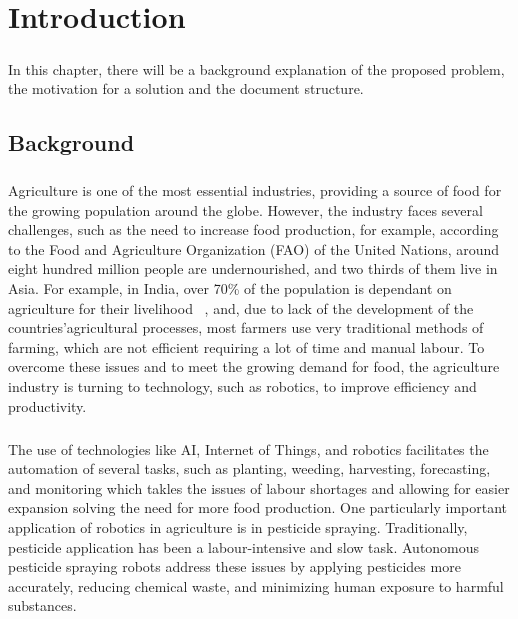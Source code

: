 
%

\chapter{Introduction}
\label{cha:introduction}
\paragraph{}In this chapter, there will be a background explanation of the proposed problem, 
the motivation for a solution and the document structure.

\section{Background}
\label{sec:background} 
\paragraph{}Agriculture is one of the most essential industries, providing a source of food for the growing population 
around the globe. However, the industry faces several challenges, such as the need to increase food production, 
for example, according to the Food and Agriculture Organization (FAO) of the United Nations, around eight hundred million 
people are undernourished, and two thirds of them live in Asia. For example, in India, over 70\% of the population 
is dependant on agriculture for their livelihood ~\cite{agriIndia}, and, due to lack of the development of 
the countries’agricultural processes, most farmers use very traditional methods of farming, which are not efficient 
requiring a lot of time and manual labour. To overcome these issues and to meet the growing demand for food,
the agriculture industry is turning to technology, such as robotics, to improve efficiency and productivity.
\paragraph{}The use of technologies like AI, Internet of Things, and robotics facilitates the automation of 
several tasks, such as planting, weeding, harvesting, forecasting, and monitoring which takles the issues of 
labour shortages and allowing for easier expansion solving the need for more food production. One particularly important application of robotics in agriculture is in pesticide spraying. 
Traditionally, pesticide application has been a labour-intensive and slow task. Autonomous pesticide 
spraying robots address these issues by applying pesticides more accurately, reducing chemical waste, and 
minimizing human exposure to harmful substances.


